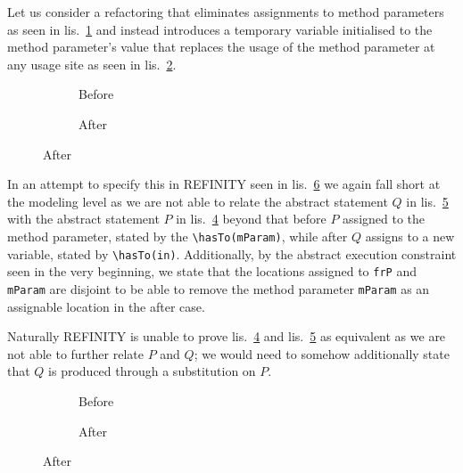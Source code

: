 Let us consider a refactoring that eliminates assignments to method parameters as seen in lis.~\ref{lst:RemoveAssignment-java-before} and instead introduces a temporary variable initialised to the method parameter's value that replaces the usage of the method parameter at any usage site as seen in lis.~\ref{lst:RemoveAssignment-java-after}.

\begin{figure}
  \begin{subfigure}[b]{.45\linewidth}
    
    \caption{Before}
    \label{lst:RemoveAssignment-java-before}
  \end{subfigure}\hfill
  \begin{subfigure}[b]{.45\linewidth}
    
    \caption{After}
    \label{lst:RemoveAssignment-java-after}
  \end{subfigure}
  \label{lst:RemovAssignment-java}
\end{figure}

In an attempt to specify this in REFINITY seen in lis.~\ref{lst:RemovAssignment-refinity} we again fall short at the modeling level as we are not able to relate the abstract statement $Q$ in lis.~\ref{lst:RemoveAssignment-refinity-after} with the abstract statement $P$ in lis.~\ref{lst:RemoveAssignment-refinity-before} beyond that before $P$ assigned to the method parameter, stated by the \lstinline[style=refinity]|\hasTo(mParam)|, while after $Q$ assigns to a new variable, stated by \lstinline[style=refinity]|\hasTo(in)|. Additionally, by the abstract execution constraint seen in the very beginning, we state that the locations
assigned to \lstinline[style=refinity]|frP| and \lstinline[style=refinity]|mParam| are disjoint to be able to remove the method parameter \lstinline[style=refinity]|mParam| as an assignable location in the after case.

Naturally REFINITY is unable to prove lis.~\ref{lst:RemoveAssignment-refinity-before} and lis.~\ref{lst:RemoveAssignment-refinity-after} as equivalent
as we are not able to further relate $P$ and $Q$; we would need to somehow additionally state that $Q$ is produced through a substitution on $P$.

\begin{figure}
  \begin{subfigure}[b]{.45\linewidth}
    
    \caption{Before}
    \label{lst:RemoveAssignment-refinity-before}
  \end{subfigure}\hfill
  \begin{subfigure}[b]{.45\linewidth}
    
    \caption{After}
    \label{lst:RemoveAssignment-refinity-after}
  \end{subfigure}
  \label{lst:RemovAssignment-refinity}
\end{figure}

